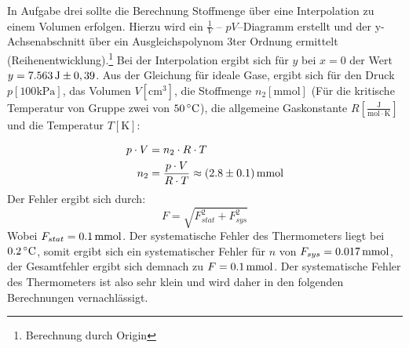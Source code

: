 In Aufgabe drei sollte die Berechnung Stoffmenge über eine Interpolation zu einem Volumen erfolgen. Hierzu wird ein $\frac{1}{V}$ -- $pV$--Diagramm erstellt und der y-Achsenabschnitt über ein Ausgleichspolynom 3ter Ordnung ermittelt (Reihenentwicklung).\footnote{Berechnung durch Origin} Bei der Interpolation ergibt sich für $y$ bei $x=0$ der Wert $y=\unit[7.563]{J}  \pm 0,39$. Aus der Gleichung für ideale Gase, ergibt sich für den Druck $p [\mathrm{100kPa}]$, das Volumen $V [\mathrm{cm^3}]$, die Stoffmenge $n_2 [\mathrm{mmol}]$ (Für die kritische Temperatur von Gruppe zwei von $\unit[50]{^\circ C}$), die allgemeine Gaskonstante $R [\mathrm{\frac{J}{mol \cdot K}}]$ und die Temperatur $T [\mathrm{K}]$:

\begin{align}
p \cdot V &= n_2 \cdot R \cdot T\\
n_2 &= \frac{p \cdot V}{R \cdot T} \approx \unit[(2.8 \pm 0.1)]{mmol} \notag
\end{align}
Der Fehler ergibt sich durch:
\[
F = \sqrt{F_{stat}^2 + F_{sys}^2}
\]
Wobei $F_{stat} = \unit[0.1]{mmol}$. Der systematische Fehler des Thermometers liegt bei $\unit[0.2]{^\circ C}$, somit ergibt sich ein systematischer Fehler für $n$ von $F_{sys} = \unit[0.017]{mmol}$, der Gesamtfehler ergibt sich demnach zu $F = \unit[0.1]{mmol}$. Der systematische Fehler des Thermometers ist also sehr klein und wird daher in den folgenden Berechnungen vernachlässigt.
